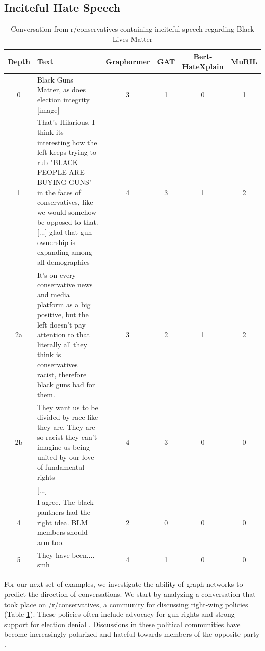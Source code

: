\documentclass[letterpaper]{article} %
\begin{document}
\subsection{Inciteful Hate Speech}
\begin{table}
    \centering
        \caption{Conversation from r/conservatives containing inciteful speech regarding Black Lives Matter \\}
    \begin{tabular}{c|p{8cm}|c|c|c|c}
        Depth & Text & Graphormer & GAT & Bert-HateXplain & MuRIL \\
        \hline
        \hline
        0 & Black Guns Matter, as does election integrity [image] & 3 & 1 & 0 & 1 \\
        \hline
        1 & That's Hilarious. I think its interesting how the left keeps trying to rub "BLACK PEOPLE ARE BUYING GUNS" in the faces of conservatives, like we would somehow be opposed to that. [...] glad that gun ownership is expanding among all demographics & 4 & 3 & 1 & 2  \\
        \hline
        2a & It's on every conservative news and media platform as a big positive, but the left doesn't pay attention to that literally all they think is conservatives racist, therefore black guns bad for them. & 3 & 2 & 1 & 2 \\
        \hline
        2b & They want us to be divided by race like they are. They are so racist they can't imagine us being united by our love of fundamental rights & 4 & 3 & 0 & 0\\
        \hline
          & [...] & & \\
        \hline
        4 & I agree. The black panthers had the right idea. BLM members should arm too. & 2 & 0 & 0 & 0 \\
        \hline
        5 & They have been.... smh & 4 & 1 & 0 & 0\\
    \end{tabular}

    \label{tab:predictive-conservative}
\end{table}
For our next set of examples, we investigate the ability of graph networks to predict the direction of conversations. We start by analyzing a conversation that took place on /r/conservatives, a community for discussing right-wing policies (Table \ref{tab:predictive-conservative}). These policies often include advocacy for gun rights and strong support for election denial \cite{block_2021}. Discussions in these political communities have become increasingly polarized and hateful towards members of the opposite party \cite{Waller2021}.
\end{document}
